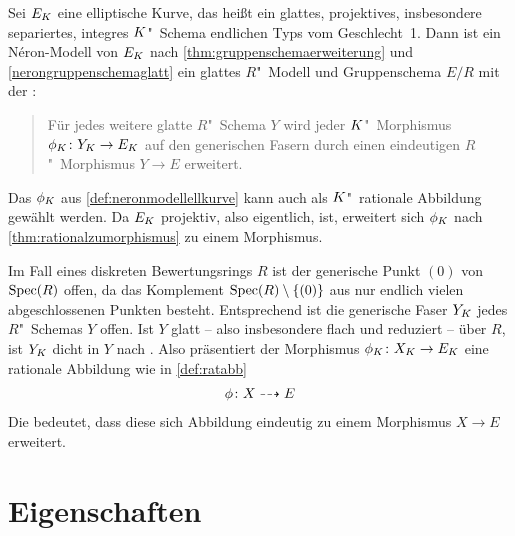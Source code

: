 
\begin{SatzDefinition}
  \label{def:neronmodellellkurve}
  Sei $E_{K}$ eine elliptische Kurve, das heißt ein
  glattes, projektives, insbesondere separiertes, integres
  $K$"~Schema endlichen Typs vom Geschlecht~1.
  Dann ist ein Néron-Modell von $E_{K}$ nach
  \ref{thm:gruppenschemaerweiterung} und \ref{nerongruppenschemaglatt}
  ein glattes $R$"~Modell und Gruppenschema $E/R$ mit der
  \NAbbEig:
  \begin{quote}
    Für jedes weitere glatte $R$"~Schema $Y$ wird jeder
    $K$"~Morphismus ${\phi_{K}\colon Y_{K}\to E_{K}}$ auf den generischen
    Fasern durch einen eindeutigen $R$"~Morphismus ${Y\to E}$ erweitert.
  \end{quote}
\end{SatzDefinition}
\begin{Bemerkung}\label{thm:dichtefaser}
  Das $\phi_{K}$ aus \ref{def:neronmodellellkurve} kann auch als
  $K$"~rationale Abbildung gewählt werden. Da $E_{K}$ projektiv, also
  eigentlich, ist, erweitert sich $\phi_{K}$ nach
  \ref{thm:rationalzumorphismus} zu einem Morphismus.

  Im Fall eines diskreten Bewertungsrings $R$ ist der generische Punkt
  $(0)$ von $\operatorname{Spec}(R)$ offen, da das Komplement
  $\operatorname{Spec}(R)\setminus\{(0)\}$ aus nur endlich vielen abgeschlossenen
  Punkten besteht. Entsprechend ist die generische Faser $Y_{K}$ jedes
  $R$"~Schemas $Y$ offen.
  Ist $Y$ glatt – also insbesondere flach und reduziert – über $R$,
  ist $Y_{K}$ dicht in $Y$ nach \cite[Proposition~III.9.7]{hartshorne}.
  Also präsentiert der Morphismus ${\phi_{K}\colon X_{K}\to E_{K}}$ eine
  rationale Abbildung wie in \ref{def:ratabb}
  \begin{gather*}
    \phi\colon X\dashrightarrow E
  \end{gather*}
  Die \NAbbEig bedeutet, dass diese sich Abbildung eindeutig zu einem
  Morphismus $X\to E$ erweitert.
\end{Bemerkung}


\section{Eigenschaften}
